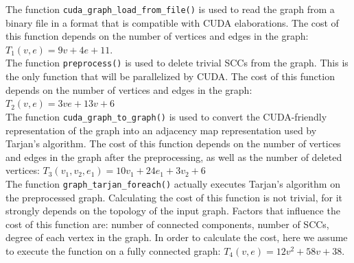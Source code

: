\noindent The function \verb|cuda_graph_load_from_file()| is used to read the graph from a binary file in a format that is compatible with CUDA elaborations. The cost of this function depends on the number of vertices and edges in the graph: $T_1(v,e)=9v+4e+11$.
\\ The function \verb|preprocess()| is used to delete trivial SCCs from the graph. This is the only function that will be parallelized by CUDA. The cost of this function depends on the number of vertices and edges in the graph: $T_2(v,e)=3ve+13v+6$
\\ The function \verb|cuda_graph_to_graph()| is used to convert the CUDA-friendly representation of the graph into an adjacency map representation used by Tarjan's algorithm. The cost of this function depends on the number of vertices and edges in the graph after the preprocessing, as well as the number of deleted vertices: $T_3(v_1,v_2,e_1)=10v_1+24e_1+3v_2+6$
\\ The function \verb|graph_tarjan_foreach()| actually executes Tarjan's algorithm on the preprocessed graph. Calculating the cost of this function is not trivial, for it strongly depends on the topology of the input graph. Factors that influence the cost of this function are: number of connected components, number of SCCs, degree of each vertex in the graph. In order to calculate the cost, here we assume to execute the function on a fully connected graph: $T_4(v,e)=12v^2+58v+38$.

